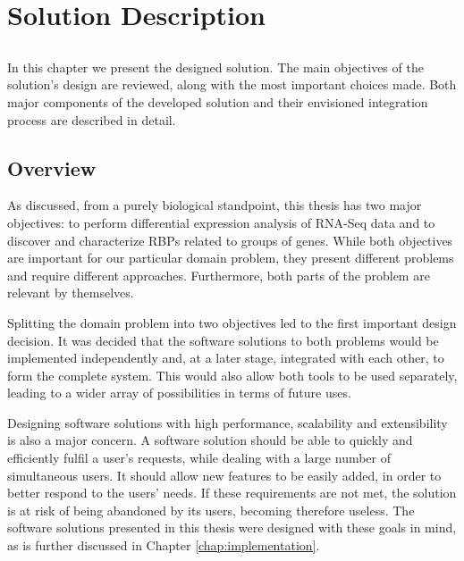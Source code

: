 \chapter{Solution Description} \label{chap:description}

\section*{}

In this chapter we present the designed solution. The main objectives of the
solution's design are reviewed, along with the most important choices made. Both
major components of the developed solution and their envisioned integration
process are described in detail.

\section{Overview}


As discussed, from a purely biological standpoint, this thesis has two major
objectives: to perform differential expression analysis of RNA-Seq data and to
discover and characterize RBPs related to groups of genes. While both objectives
are important for our particular domain problem, they present different problems
and require different approaches. Furthermore, both parts of the problem are
relevant by themselves.

Splitting the domain problem into two objectives led to the first important
design decision. It was decided that the software solutions to both problems
would be implemented independently and, at a later stage, integrated with each
other, to form the complete system. This would also allow both tools to be used
separately, leading to a wider array of possibilities in terms of future uses.

Designing software solutions with high performance, scalability and
extensibility is also a major concern. A software solution should be able to
quickly and efficiently fulfil a user's requests, while dealing with a large
number of simultaneous users. It should allow new features to be easily added,
in order to better respond to the users' needs. If these requirements are not
met, the solution is at risk of being abandoned by its users, becoming therefore
useless. The software solutions presented in this thesis were designed with
these goals in mind, as is further discussed in Chapter
\ref{chap:implementation}.

